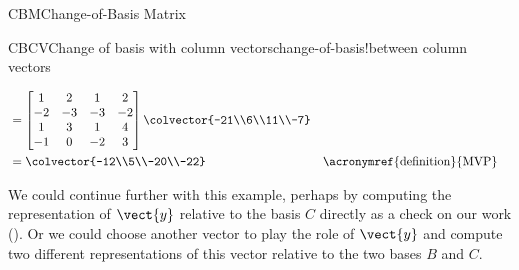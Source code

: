 \begin{subsect}{CBM}{Change-of-Basis Matrix}
\begin{example}{CBCV}{Change of basis with column vectors}{change-of-basis!between column vectors}
\begin{para}
\begin{align*}
%
&=
\begin{bmatrix}
1 & 2 & 1 & 2 \\
-2 & -3 & -3 & -2 \\
1 & 3 & 1 & 4 \\
-1 & 0 & -2 & 3
\end{bmatrix}
\colvector{-21\\6\\11\\-7}\\
%
&=\colvector{-12\\5\\-20\\-22}&&\text{\acronymref{definition}{MVP}}
%
\end{align*}
\end{para}
%
\begin{para}We could continue further with this example, perhaps by computing the representation of $\vect{y}$ relative to the basis $C$ directly as a check on our work ().  Or we could choose another vector to play the role of $\vect{y}$ and compute two different representations of this vector relative to the two bases $B$ and $C$.\end{para}
%
\end{example}
%
%
\end{subsect}
%
